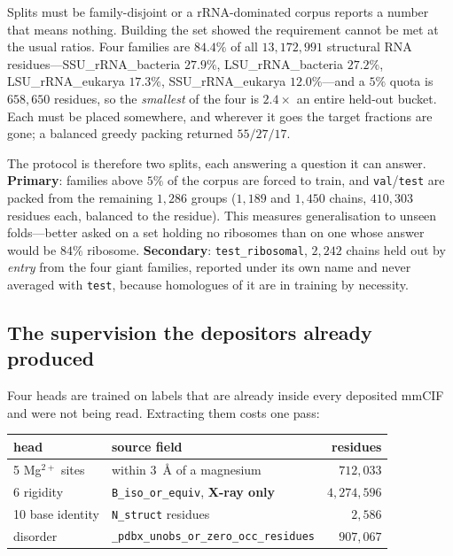 \documentclass[11pt,a4paper]{article}
\begin{document}
Splits must be family-disjoint or a rRNA-dominated corpus reports a number that
means nothing. Building the set showed the requirement cannot be met at the
usual ratios. Four families are $\mathbf{84.4\%}$ of all $13{,}172{,}991$
structural RNA residues---SSU\_rRNA\_bacteria $27.9\%$, LSU\_rRNA\_bacteria
$27.2\%$, LSU\_rRNA\_eukarya $17.3\%$, SSU\_rRNA\_eukarya $12.0\%$---and a $5\%$
quota is $658{,}650$ residues, so the \emph{smallest} of the four is
$2.4\times$ an entire held-out bucket. Each must be placed somewhere, and
wherever it goes the target fractions are gone; a balanced greedy packing
returned $55/27/17$.

The protocol is therefore two splits, each answering a question it can answer.
\textbf{Primary}: families above $5\%$ of the corpus are forced to train, and
\texttt{val}/\texttt{test} are packed from the remaining $1{,}286$ groups
($1{,}189$ and $1{,}450$ chains, $410{,}303$ residues each, balanced to the
residue). This measures generalisation to unseen folds---better asked on a set
holding no ribosomes than on one whose answer would be $84\%$ ribosome.
\textbf{Secondary}: \texttt{test\_ribosomal}, $2{,}242$ chains held out by
\emph{entry} from the four giant families, reported under its own name and
never averaged with \texttt{test}, because homologues of it are in training by
necessity.

\subsection{The supervision the depositors already produced}

Four heads are trained on labels that are already inside every deposited mmCIF
and were not being read. Extracting them costs one pass:

\begin{table}[h]
\centering
\small
\begin{tabular}{llr}
\toprule
\textbf{head} & \textbf{source field} & \textbf{residues} \\
\midrule
5 Mg$^{2+}$ sites   & within $3$~\AA{} of a magnesium & $712{,}033$ \\
6 rigidity          & \texttt{B\_iso\_or\_equiv}, \textbf{X-ray only} & $4{,}274{,}596$ \\
10 base identity    & \texttt{N\_struct} residues & $2{,}586$ \\
disorder            & \texttt{\_pdbx\_unobs\_or\_zero\_occ\_residues} & $907{,}067$ \\
\bottomrule
\end{tabular}
\end{table}
\end{document}
